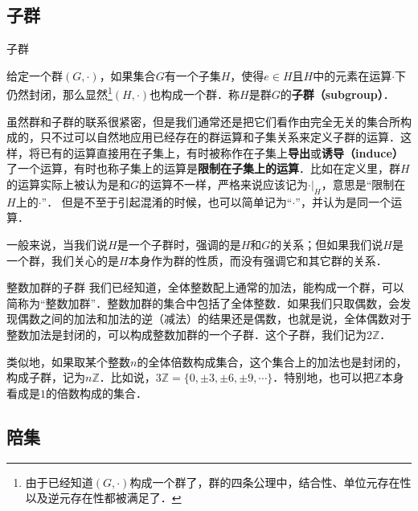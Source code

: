 
\subsection{子群}

\begin{definition}{子群}

给定一个群$(G, \cdot)$，如果集合$G$有一个子集$H$，使得$e\in H$且$H$中的元素在运算$\cdot$下仍然封闭，那么显然\footnote{由于已经知道$(G,\cdot)$构成一个群了，群的四条公理中，结合性、单位元存在性以及逆元存在性都被满足了．}$(H,\cdot)$也构成一个群．称$H$是群$G$的\textbf{子群（subgroup）}．

\end{definition}

虽然群和子群的联系很紧密，但是我们通常还是把它们看作由完全无关的集合所构成的，只不过可以自然地应用已经存在的群运算和子集关系来定义子群的运算．这样，将已有的运算直接用在子集上，有时被称作在子集上\textbf{导出}或\textbf{诱导（induce）}了一个运算，有时也称子集上的运算是\textbf{限制在子集上的运算}．比如在定义里，群$H$的运算实际上被认为是和$G$的运算不一样，严格来说应该记为$\cdot|_H$，意思是“限制在$H$上的$\cdot$”． 但是不至于引起混淆的时候，也可以简单记为“$\cdot$”，并认为是同一个运算．

一般来说，当我们说$H$是一个子群时，强调的是$H$和$G$的关系；但如果我们说$H$是一个群，我们关心的是$H$本身作为群的性质，而没有强调它和其它群的关系．

\begin{example}{整数加群的子群}\label{Group1_ex1}
我们已经知道，全体整数配上通常的加法，能构成一个群，可以简称为“整数加群”．整数加群的集合中包括了全体整数．如果我们只取偶数，会发现偶数之间的加法和加法的逆（减法）的结果还是偶数，也就是说，全体偶数对于整数加法是封闭的，可以构成整数加群的一个子群．这个子群，我们记为$2\mathbb{Z}$．

类似地，如果取某个整数$n$的全体倍数构成集合，这个集合上的加法也是封闭的，构成子群，记为$n\mathbb{Z}$．比如说，$3\mathbb{Z}=\{0, \pm3, \pm6, \pm9, \cdots\}$．特别地，也可以把$\mathbb{Z}$本身看成是$1$的倍数构成的集合．



\end{example}




\subsection{陪集}

